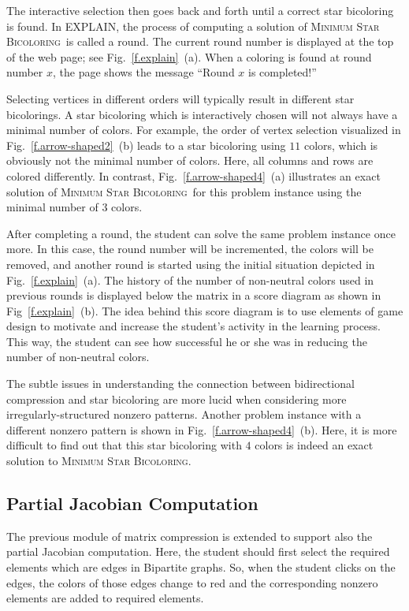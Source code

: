 \documentclass[11pt, twoside,a4paper]{book}
\newcommand{\MinStaBic}{\textsc{Minimum Star Bicoloring}}
\begin{document}
The interactive selection then goes back and forth until a correct star bicoloring is
found. In EXPLAIN, the process of computing a solution of \MinStaBic\ is called a round.
The current round number is displayed at the top of the web page; see
Fig.~\ref{f.explain}~(a). When a coloring is found at round number $x$, the page shows
the message ``Round $x$ is completed!''

Selecting vertices in different orders will typically result in different star
bicolorings. A star bicoloring which is interactively chosen will not always have a
minimal number of colors. For example, the order of vertex selection visualized in
Fig.~\ref{f.arrow-shaped2}~(b) leads to a star bicoloring using $11$ colors, which is
obviously not the minimal number of colors. Here, all columns and rows are colored
differently. In contrast, Fig.~\ref{f.arrow-shaped4}~(a) illustrates an exact solution of
\MinStaBic\ for this problem instance using the minimal number of $3$ colors.

After completing a round, the student can solve the same problem instance once more. In
this case, the round number will be incremented, the colors will be removed, and another
round is started using the initial situation depicted in Fig.~\ref{f.explain}~(a). The
history of the number of non-neutral colors used in previous rounds is displayed below
the matrix in a score diagram as shown in Fig~\ref{f.explain}~(b). The idea behind this
score diagram is to use elements of game design to motivate and increase the student's
activity in the learning process. This way, the student can see how successful he or she
was in reducing the number of non-neutral colors.

The subtle issues in understanding the connection between bidirectional compression and
star bicoloring are more lucid when considering more irregularly-structured nonzero
patterns. Another problem instance with a different nonzero pattern is shown in
Fig.~\ref{f.arrow-shaped4}~(b). Here, it is more difficult to find out that this star
bicoloring with $4$ colors is indeed an exact solution to \MinStaBic.

\subsection{Partial Jacobian Computation}
The previous module of matrix compression is extended to support
also the partial Jacobian computation. Here, the student should
first select the required elements which are edges in Bipartite graphs.
So, when the student clicks on the edges, the colors of those edges change to red
and the corresponding nonzero elements are added to required elements.
\end{document}
